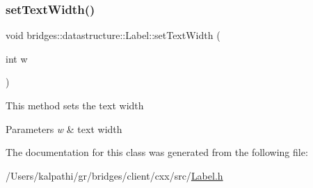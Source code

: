 \subsubsection{\texorpdfstring{set\+Text\+Width()}{setTextWidth()}}
{\footnotesize\ttfamily void bridges\+::datastructure\+::\+Label\+::set\+Text\+Width (\begin{DoxyParamCaption}\item[{int}]{w }\end{DoxyParamCaption})\hspace{0.3cm}{\ttfamily [inline]}}

This method sets the text width


\begin{DoxyParams}{Parameters}
{\em w} & text width \\
\hline
\end{DoxyParams}


The documentation for this class was generated from the following file\+:\begin{DoxyCompactItemize}
\item 
/\+Users/kalpathi/gr/bridges/client/cxx/src/\mbox{\hyperlink{_label_8h}{Label.\+h}}\end{DoxyCompactItemize}
